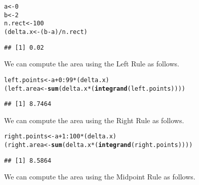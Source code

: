 \documentclass{article}\usepackage[]{graphicx}\usepackage[]{xcolor}
\makeatletter
\newcommand{\hlnum}[1]{\textcolor[rgb]{0.686,0.059,0.569}{#1}}%
\newcommand{\hlopt}[1]{\textcolor[rgb]{0,0,0}{#1}}%
\newcommand{\hldef}[1]{\textcolor[rgb]{0.345,0.345,0.345}{#1}}%
\newcommand{\hlkwb}[1]{\textcolor[rgb]{0.69,0.353,0.396}{#1}}%
\newcommand{\hlkwd}[1]{\textcolor[rgb]{0.737,0.353,0.396}{\textbf{#1}}}%
\newenvironment{kframe}{%
 \def\at@end@of@kframe{}%
 \ifinner\ifhmode%
  \def\at@end@of@kframe{\end{minipage}}%
  \begin{minipage}{\columnwidth}%
 \fi\fi%
 \def\FrameCommand##1{\hskip\@totalleftmargin \hskip-\fboxsep
 \colorbox{shadecolor}{##1}\hskip-\fboxsep
     \hskip-\linewidth \hskip-\@totalleftmargin \hskip\columnwidth}%
 \MakeFramed {\advance\hsize-\width
   \@totalleftmargin\z@ \linewidth\hsize
   \@setminipage}}%
 {\par\unskip\endMakeFramed%
 \at@end@of@kframe}
\newenvironment{knitrout}{}{} %
\makeatother
\begin{document}
\begin{enumerate}
\begin{knitrout}\scriptsize
{}\color{fgcolor}\begin{kframe}
\begin{alltt}
\hldef{a} \hlkwb{<-} \hlnum{0}
\hldef{b} \hlkwb{<-} \hlnum{2}
\hldef{n.rect} \hlkwb{<-} \hlnum{100}
\hldef{(delta.x} \hlkwb{<-} \hldef{(b}\hlopt{-}\hldef{a)}\hlopt{/}\hldef{n.rect)}
\end{alltt}
\begin{verbatim}
## [1] 0.02
\end{verbatim}
\end{kframe}
\end{knitrout}
We can compute the area using the Left Rule as follows.
\begin{knitrout}\scriptsize
{}\color{fgcolor}\begin{kframe}
\begin{alltt}
\hldef{left.points} \hlkwb{<-} \hldef{a} \hlopt{+} \hlnum{0}\hlopt{:}\hlnum{99}\hlopt{*}\hldef{(delta.x)}
\hldef{(left.area} \hlkwb{<-} \hlkwd{sum}\hldef{(delta.x}\hlopt{*}\hldef{(}\hlkwd{integrand}\hldef{(left.points))))}
\end{alltt}
\begin{verbatim}
## [1] 8.7464
\end{verbatim}
\end{kframe}
\end{knitrout}
We can compute the area using the Right Rule as follows.
\begin{knitrout}\scriptsize
{}\color{fgcolor}\begin{kframe}
\begin{alltt}
\hldef{right.points} \hlkwb{<-} \hldef{a} \hlopt{+} \hlnum{1}\hlopt{:}\hlnum{100}\hlopt{*}\hldef{(delta.x)}
\hldef{(right.area} \hlkwb{<-} \hlkwd{sum}\hldef{(delta.x}\hlopt{*}\hldef{(}\hlkwd{integrand}\hldef{(right.points))))}
\end{alltt}
\begin{verbatim}
## [1] 8.5864
\end{verbatim}
\end{kframe}
\end{knitrout}
We can compute the area using the Midpoint Rule as follows.
\begin{knitrout}\scriptsize
{}\color{fgcolor}\begin{kframe}
\begin{alltt}

\end{alltt}
\end{kframe}
\end{knitrout}
\end{enumerate}
\end{document}
